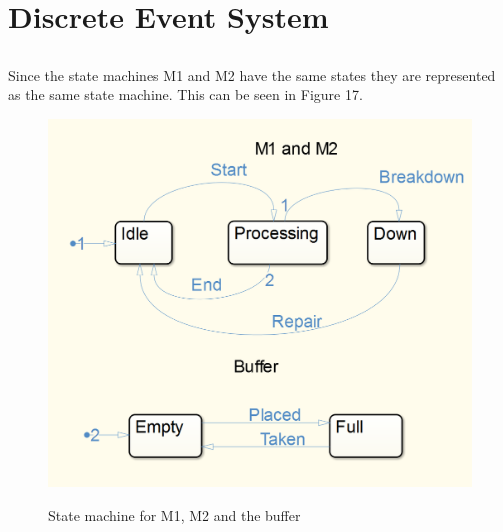 \documentclass[12pt,a4paper]{article}
\begin{document}
\section{Discrete Event System}
\subsection{}
Since the state machines M1 and M2 have the same states they are represented as the same state machine. This can be seen in Figure 17.	
\begin{center}
	\begin{figure}[H]
      \centering
	\includegraphics[scale=0.5]{des1.png}
	\label{fig:des1}
	\caption{State machine for M1, M2 and the buffer}
	\end{figure}
\end{center}
\end{document}
